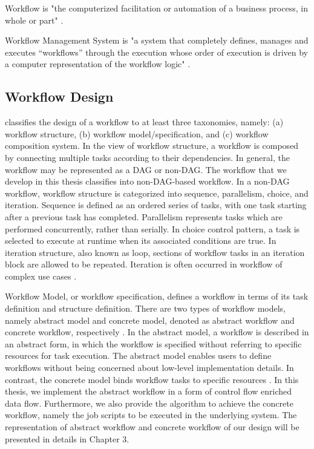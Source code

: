 \begin{definition}
Workflow is "the computerized facilitation or automation of a business process, in whole or part" \cite{hollingsworth1993workflow}.
\label{def:workflow}
\end{definition}

\begin{definition}
Workflow Management System is "a system that completely defines, manages and executes “workflows” through the execution whose order of execution is driven by a computer representation of the workflow logic" \cite{hollingsworth1993workflow}.
\label{def:wms}
\end{definition}

\subsection{Workflow Design}\label{sec:WFDesign}
\cite{yu2005taxonomy} classifies the design of a workflow to at least three taxonomies, namely: (a) workflow structure, (b) workflow model/specification, and (c) workflow composition system. In the view of workflow structure, a workflow is composed by connecting multiple tasks according to their dependencies. In general, the workflow may be represented as a DAG or non-DAG. The workflow that we develop in this thesis classifies into non-DAG-based workflow. In a non-DAG workflow, workflow structure is categorized into sequence, parallelism, choice, and iteration. Sequence is defined as an ordered series of tasks, with one task starting after a previous task has completed. Parallelism represents tasks which are performed concurrently, rather than serially. In choice control pattern, a task is selected to execute at runtime when its associated conditions are true. In iteration structure, also known as loop, sections of workflow tasks in an iteration block are allowed to be repeated. Iteration is often occurred in workflow of complex use cases \cite{yu2005taxonomy}. 

Workflow Model, or workflow specification, defines a workflow in terms of its task definition and structure definition. There are two types of workflow models, namely abstract model and concrete model, denoted as abstract workflow and concrete workflow, respectively \cite{deelman2004workflow}. In the abstract model, a workflow is described in an abstract form, in which the workflow is specified without referring to specific resources for task execution. The abstract model enables users to define workflows without being concerned about low-level implementation details. In contrast, the concrete model binds workflow tasks to specific resources \cite{yu2005taxonomy}. In this thesis, we implement the abstract workflow in a form of control flow enriched data flow. Furthermore, we also provide the algorithm to achieve the concrete workflow, namely the job scripts to be executed in the underlying system. The representation of abstract workflow and concrete workflow of our design will be presented in details in Chapter 3. 

